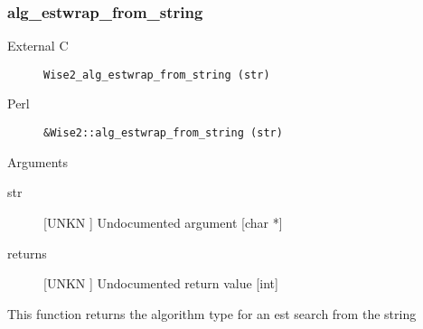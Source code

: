 \subsubsection{alg_estwrap_from_string}
\begin{description}
\item[External C] {\tt Wise2_alg_estwrap_from_string (str)}
\item[Perl] {\tt &Wise2::alg_estwrap_from_string (str)}

\end{description}
Arguments
\begin{description}
\item[str] [UNKN ] Undocumented argument [char *]
\item[returns] [UNKN ] Undocumented return value [int]
\end{description}
This function returns the algorithm type
for an est search from the string




